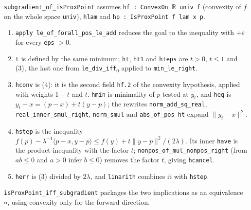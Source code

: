 \documentclass[11pt,a4paper]{report}
\begin{document}
\begin{leanbox}
\texttt{subgradient\_\allowbreak{}of\_\allowbreak{}is\allowbreak{}Prox\allowbreak{}Point} assumes \texttt{hf : Convex\allowbreak{}On \ensuremath{\mathbb R} univ f} (convexity of \(f\) on the whole space \texttt{univ}), \texttt{hlam} and \texttt{hp : Is\allowbreak{}Prox\allowbreak{}Point f lam x p}.



\begin{enumerate}


\item \texttt{apply le\_\allowbreak{}of\_\allowbreak{}forall\_\allowbreak{}pos\_\allowbreak{}le\_\allowbreak{}add} reduces the goal to the inequality with \(+\varepsilon\) for every \texttt{eps} \(>0\).

\item \texttt{t} is defined by the same minimum; \texttt{ht}, \texttt{ht1} and \texttt{hteps} are \(t>0\), \(t\le1\) and (3), the last one from \texttt{le\_\allowbreak{}div\_\allowbreak{}iff\ensuremath{{}_{0}}} applied to \texttt{min\_\allowbreak{}le\_\allowbreak{}right}.

\item \texttt{hconv} is (4): it is the second field \texttt{hf.\allowbreak{}2} of the convexity hypothesis, applied with weights \(1-t\) and \(t\). \texttt{hmin} is minimality of \(p\) tested at \(y_t\), and \texttt{heq} is \(y_t-x=(p-x)+t(y-p)\); the rewrites \texttt{norm\_\allowbreak{}add\_\allowbreak{}sq\_\allowbreak{}real}, \texttt{real\_\allowbreak{}inner\_\allowbreak{}smul\_\allowbreak{}right}, \texttt{norm\_\allowbreak{}smul} and \texttt{abs\_\allowbreak{}of\_\allowbreak{}pos ht} expand \(\|y_t-x\|^2\).

\item \texttt{hstep} is the inequality \(f(p)-\lambda^{-1}\langle p-x,y-p\rangle\le f(y)+t\|y-p\|^2/(2\lambda)\). Its inner \texttt{have} is the product inequality with the factor \(t\); \texttt{nonpos\_\allowbreak{}of\_\allowbreak{}mul\_\allowbreak{}nonpos\_\allowbreak{}right} (from \(ab\le0\) and \(a>0\) infer \(b\le0\)) removes the factor \(t\), giving \texttt{hcancel}.

\item \texttt{herr} is (3) divided by \(2\lambda\), and \texttt{linarith} combines it with \texttt{hstep}.

\end{enumerate}



\texttt{is\allowbreak{}Prox\allowbreak{}Point\_\allowbreak{}iff\_\allowbreak{}subgradient} packages the two implications as an equivalence \texttt{↔}, using convexity only for the forward direction.
\end{leanbox}
\end{document}
